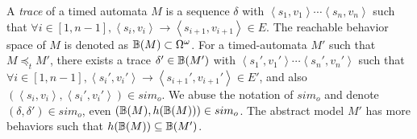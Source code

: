 A \emph{trace} of a timed automata $M$ is a sequence $\delta$ with $\left\langle s_1,v_1\right\rangle\cdots\left\langle s_n,v_n\right\rangle$ such that $\forall i\in[1,n-1], \left\langle s_i,v_i\right\rangle\rightarrow\left\langle s_{i+1},v_{i+1}\right\rangle\in E $. The reachable behavior space of $M$ is denoted as $\mathbb{B}(M)\subset \Omega^\omega$. 
For a timed-automata $M'$ such that $M\preceq_t M'$, there exists a trace $\delta'\in\mathbb{B}{(M')}$ with $\left\langle s_1',v_1'\right\rangle\cdots\left\langle s_n',v_n'\right\rangle$ such that $\forall i\in[1,n-1], \left\langle s_i',v_i'\right\rangle\rightarrow\left\langle s_{i+1}',v_{i+1}'\right\rangle\in E'$, and also $(\left\langle s_i,v_i\right\rangle,\left\langle s_i',v_i'\right\rangle)\in sim_o$. We abuse the notation of  $sim_o$ and denote $(\delta,\delta')\in sim_o$, even $(\mathbb{B}{(M)},h(\mathbb{B}{(M)}))\in sim_o$. The abstract model $M'$ has more behaviors such that $h(\mathbb{B}{(M)})\subseteq \mathbb{B}{(M')}$.


